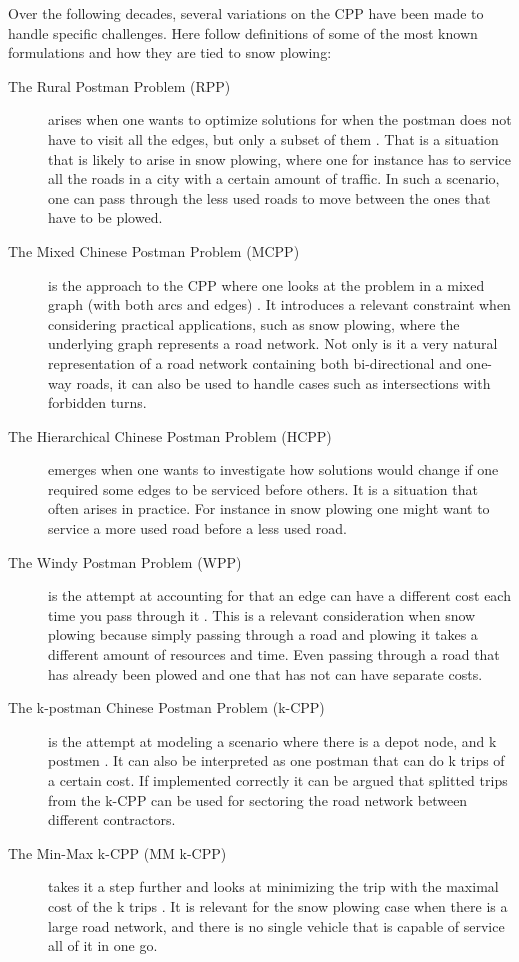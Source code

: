 Over the following decades, several variations on the CPP have been made to handle specific challenges. Here follow definitions of some of the most known formulations and how they are tied to snow plowing:

\begin{description}

\item [The Rural Postman Problem (RPP)] arises when one wants to optimize solutions for when the postman does not have to visit all the edges, but only a subset of them \citep{pearn1995RPP}. That is a situation that is likely to arise in snow plowing, where one for instance has to service all the roads in a city with a certain amount of traffic. In such a scenario, one can pass through the less used roads to move between the ones that have to be plowed.

\item [The Mixed Chinese Postman Problem (MCPP)] is the approach to the CPP where one looks at the problem in a mixed graph (with both arcs and edges) \citep{pearn1995mixedCPP}. It introduces a relevant constraint when considering practical applications, such as snow plowing, where the underlying graph represents a road network. Not only is it a very natural representation of a road network containing both bi-directional and one-way roads, it can also be used to handle cases such as intersections with forbidden turns.

\item [The Hierarchical Chinese Postman Problem (HCPP)] \citep{ghiani2000HCPP} emerges when one wants to investigate how solutions would change if one required some edges to be serviced before others. It is a situation that often arises in practice. For instance in snow plowing one might want to service a more used road before a less used road.

\item [The Windy Postman Problem (WPP)] is the attempt at accounting for that an edge can have a different cost each time you pass through it \citep{dussault2013WPP}. This is a relevant consideration when snow plowing because simply passing through a road and plowing it takes a different amount of resources and time. Even passing through a road that has already been plowed and one that has not can have separate costs.

\item [The k-postman Chinese Postman Problem (k-CPP)] is the attempt at modeling a scenario where there is a depot node, and k postmen \citep{edmonds1973kCPP}. It can also be interpreted as one postman that can do k trips of a certain cost. If implemented correctly it can be argued that splitted trips from the k-CPP can be used for sectoring the road network between different contractors.

\item[The Min-Max k-CPP (MM k-CPP)] takes it a step further and looks at minimizing the trip with the maximal cost of the k trips \citep{frederickson1976MMkCPP}. It is relevant for the snow plowing case when there is a large road network, and there is no single vehicle that is capable of service all of it in one go. 

\end{description}

